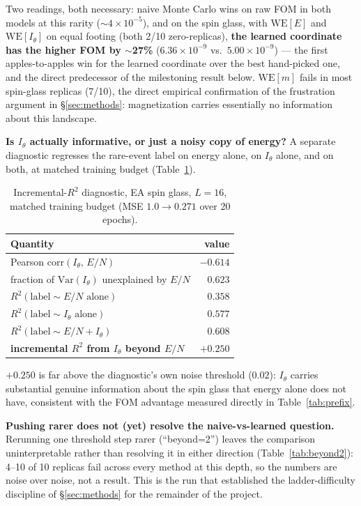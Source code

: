 \documentclass[a4paper,fleqn]{cas-sc}
\begin{document}
Two readings, both necessary: naive Monte Carlo wins on raw FOM in both models at this
rarity ($\sim\!4\times10^{-5}$), and on the spin glass, with $\mathrm{WE}[E]$ and
$\mathrm{WE}[I_\theta]$ on equal footing (both 2/10 zero-replicas), \textbf{the learned
	coordinate has the higher FOM by $\sim$27\%} ($6.36\times10^{-9}$ vs.\ $5.00\times10^{-9}$)
--- the first apples-to-apples win for the learned coordinate over the best hand-picked
one, and the direct predecessor of the milestoning result below. $\mathrm{WE}[m]$ fails in
most spin-glass replicas (7/10), the direct empirical confirmation of the frustration
argument in \S\ref{sec:methods}: magnetization carries essentially no information about
this landscape.

\textbf{Is $I_\theta$ actually informative, or just a noisy copy of energy?} A separate
diagnostic regresses the rare-event label on energy alone, on $I_\theta$ alone, and on
both, at matched training budget (Table~\ref{tab:diagnostic}).

\begin{table}[H]
\centering\small
\caption{Incremental-$R^2$ diagnostic, EA spin glass, $L=16$, matched training budget
	(MSE $1.0\to0.271$ over 20 epochs).}
\label{tab:diagnostic}
\begin{tabular}{lr}
	\toprule
	Quantity & value \\
	\midrule
	Pearson corr$(I_\theta,\,E/N)$ & $-0.614$ \\
	fraction of $\mathrm{Var}(I_\theta)$ unexplained by $E/N$ & $0.623$ \\
	$R^2(\text{label}\sim E/N\text{ alone})$ & $0.358$ \\
	$R^2(\text{label}\sim I_\theta\text{ alone})$ & $0.577$ \\
	$R^2(\text{label}\sim E/N+I_\theta)$ & $0.608$ \\
	\textbf{incremental $R^2$ from $I_\theta$ beyond $E/N$} & $\mathbf{+0.250}$ \\
	\bottomrule
\end{tabular}
\end{table}

$+0.250$ is far above the diagnostic's own noise threshold ($0.02$): $I_\theta$ carries
substantial genuine information about the spin glass that energy alone does not have,
consistent with the FOM advantage measured directly in Table~\ref{tab:prefix}.

\textbf{Pushing rarer does not (yet) resolve the naive-vs-learned question.} Rerunning one
threshold step rarer (``beyond=2'') leaves the comparison uninterpretable rather than
resolving it in either direction (Table~\ref{tab:beyond2}): 4--10 of 10 replicas fail
across every method at this depth, so the numbers are noise over noise, not a result. This
is the run that established the ladder-difficulty discipline of \S\ref{sec:methods} for the
remainder of the project.
\end{document}
